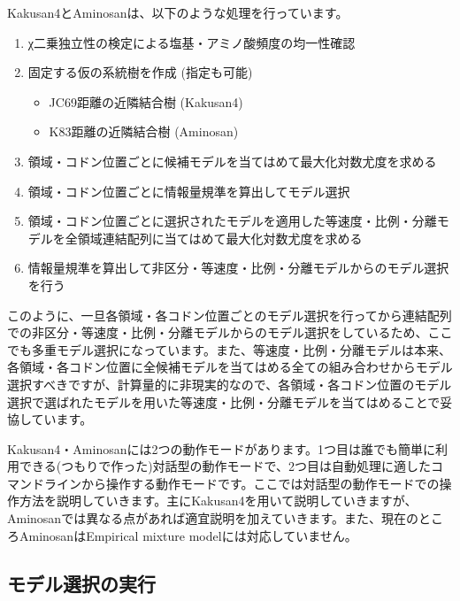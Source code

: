 \documentclass[titlepage,10pt,a4paper]{jsbook}
\begin{document}
Kakusan4とAminosanは、以下のような処理を行っています。
\begin{enumerate}\small\setlength{\baselineskip}{1.1em}
\item χ二乗独立性の検定による塩基・アミノ酸頻度の均一性確認
\item 固定する仮の系統樹を作成 (指定も可能)
\begin{itemize}
\item JC69距離の近隣結合樹 (Kakusan4)
\item K83距離の近隣結合樹 (Aminosan)
\end{itemize}
\item 領域・コドン位置ごとに候補モデルを当てはめて最大化対数尤度を求める
\item 領域・コドン位置ごとに情報量規準を算出してモデル選択
\item 領域・コドン位置ごとに選択されたモデルを適用した等速度・比例・分離モデルを全領域連結配列に当てはめて最大化対数尤度を求める
\item 情報量規準を算出して非区分・等速度・比例・分離モデルからのモデル選択を行う
\end{enumerate}
このように、一旦各領域・各コドン位置ごとのモデル選択を行ってから連結配列での非区分・等速度・比例・分離モデルからのモデル選択をしているため、ここでも多重モデル選択になっています。また、等速度・比例・分離モデルは本来、各領域・各コドン位置に全候補モデルを当てはめる全ての組み合わせからモデル選択すべきですが、計算量的に非現実的なので、各領域・各コドン位置のモデル選択で選ばれたモデルを用いた等速度・比例・分離モデルを当てはめることで妥協しています。

Kakusan4・Aminosanには2つの動作モードがあります。1つ目は誰でも簡単に利用できる(つもりで作った)対話型の動作モードで、2つ目は自動処理に適したコマンドラインから操作する動作モードです。ここでは対話型の動作モードでの操作方法を説明していきます。主にKakusan4を用いて説明していきますが、Aminosanでは異なる点があれば適宜説明を加えていきます。また、現在のところAminosanはEmpirical mixture modelには対応していません。

\subsection{モデル選択の実行}
\end{document}
